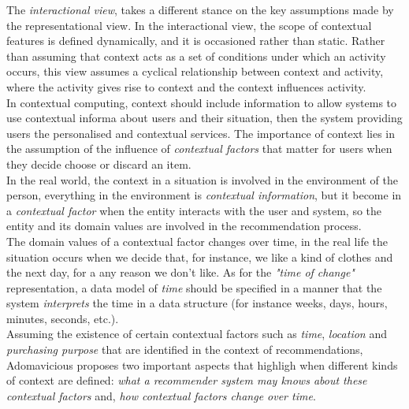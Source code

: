 The \textit{interactional view}, takes a different stance on the key
assumptions made by the representational view. In the interactional
view, the scope of contextual features is defined dynamically, and it
is occasioned rather than static. Rather than assuming that context
acts as a set of conditions under which an activity occurs, this view
assumes a cyclical relationship between context and activity, where
the activity gives rise to context and the context influences
activity.\\
In contextual computing, context should include information to allow
systems to use contextual informa about users and their situation, then the
system providing users the personalised and contextual services. The
importance of context lies in the  assumption of the influence of
\textit{contextual factors} that matter for users when they decide
choose or discard an item.\\ 
In the real world, the context in a situation is involved in the
environment of the person, everything in the environment is
\textit{contextual information}, but it become in a
\textit{contextual factor} when the entity interacts with
the user and system, so the entity and its domain values are 
involved in the recommendation process.\\ 
The domain values of a contextual factor changes over time, in
the real life the situation occurs when we decide that, for instance,
we like a kind of clothes and the next day, for a any reason we don't
like. As for the \textit{"time of change"} representation, a data 
model of \textit{time} should be specified in a manner that the system
\textit{interprets} the time in a data structure (for instance weeks, 
days, hours,  minutes, seconds, etc.). \\
Assuming the existence of certain contextual factors such as
\textit{time}, \textit{location} and \textit{purchasing purpose} that
are identified in the context of recommendations,
Adomavicious\cite{adomavicius2011context} proposes two important
aspects that highligh when different kinds of context are defined:
\textit{what a recommender system may knows about these contextual
factors} and, \textit{how contextual factors change over time}.\\ \\

